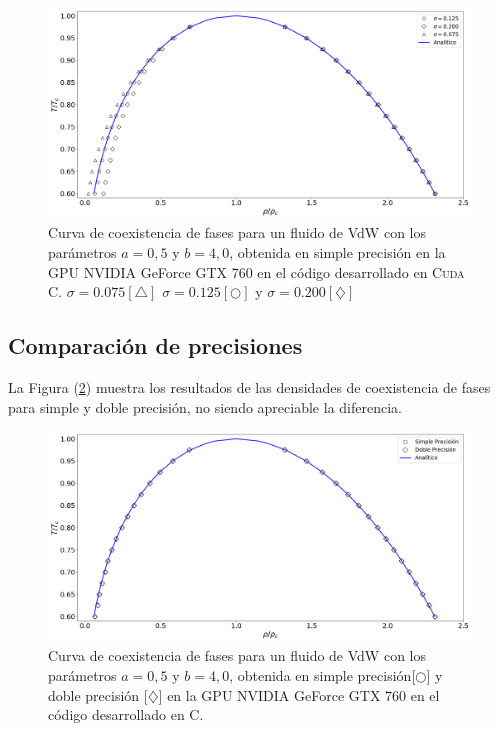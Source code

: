 \begin{figure}[h!]
	\centering
	\includegraphics[width=\textwidth]{figs/cap4/v_760_MxC_cuda_simple}
	\caption{Curva de coexistencia de fases para un fluido de VdW con los parámetros $a = 0,5 $ y $b = 4,0 $, obtenida en simple precisión en la GPU NVIDIA GeForce GTX 760 en el código desarrollado en \textsc{Cuda C}. $\sigma = 0.075[\bigtriangleup]$	 $\sigma = 0.125[\bigcirc]$ y $\sigma = 0.200[\diamondsuit]$ }
	\label{fig:v_760_MxC_cuda_simple}	
\end{figure}



\newpage
\subsection{Comparación de precisiones}

La Figura (\ref{fig:v_760_MxC_c_comparacion}) muestra los resultados de las densidades de coexistencia de fases para simple y doble precisión, no siendo apreciable la diferencia.

\begin{figure}[htbp]
	\centering
	\includegraphics[width=\textwidth]{figs/cap4/v_760_MxC_c_comparacion}
	\caption{Curva de coexistencia de fases para un fluido de VdW con los parámetros $a = 0,5 $ y $b = 4,0 $, obtenida en simple precisión[$\bigcirc$] y doble precisión [$\diamondsuit$] en la GPU NVIDIA GeForce GTX 760 en el código desarrollado en \textsc{C}.} 
	\label{fig:v_760_MxC_c_comparacion}	
\end{figure}


